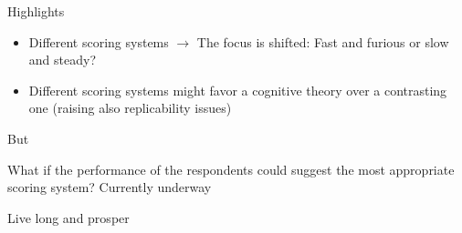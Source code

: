 \documentclass{beamer}
\begin{document}
\begin{frame}
	
	\begin{block}{Highlights}
		
		\begin{itemize}
			\item Different scoring systems $\rightarrow$ The focus is shifted: Fast and furious or slow and steady?
			\item Different scoring systems might favor a cognitive theory over a contrasting one (raising also replicability issues)
		\end{itemize}
	\end{block}
	
	
	\begin{alertblock}{But}
		
		
		What if the performance of the respondents could suggest the most appropriate scoring system? Currently underway
	\end{alertblock}
	
\end{frame}

\begin{frame}
	Live long and prosper
\end{frame}
 
\end{document}
